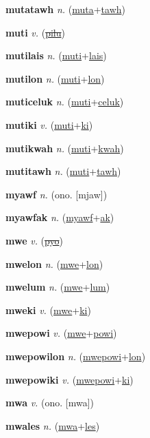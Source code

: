 \textbf{\hypertarget{mutatawh}{mutatawh}} \textit{n.} (\hyperlink{muta}{muta}+\allowbreak \hyperlink{tawh}{tawh})


\textbf{\hypertarget{muti}{muti}} \textit{v.} (\hyperlink{pilu}{\sout{pilu}})


\textbf{\hypertarget{mutilais}{mutilais}} \textit{n.} (\hyperlink{muti}{muti}+\allowbreak \hyperlink{lais}{lais})


\textbf{\hypertarget{mutilon}{mutilon}} \textit{n.} (\hyperlink{muti}{muti}+\allowbreak \hyperlink{lon}{lon})


\textbf{\hypertarget{muticeluk}{muticeluk}} \textit{n.} (\hyperlink{muti}{muti}+\allowbreak \hyperlink{celuk}{celuk})


\textbf{\hypertarget{mutiki}{mutiki}} \textit{v.} (\hyperlink{muti}{muti}+\allowbreak \hyperlink{ki}{ki})


\textbf{\hypertarget{mutikwah}{mutikwah}} \textit{n.} (\hyperlink{muti}{muti}+\allowbreak \hyperlink{kwah}{kwah})


\textbf{\hypertarget{mutitawh}{mutitawh}} \textit{n.} (\hyperlink{muti}{muti}+\allowbreak \hyperlink{tawh}{tawh})


\textbf{\hypertarget{myawf}{myawf}} \textit{n.} (ono. [mjaw])


\textbf{\hypertarget{myawfak}{myawfak}} \textit{n.} (\hyperlink{myawf}{myawf}+\allowbreak \hyperlink{ak}{ak})


\textbf{\hypertarget{mwe}{mwe}} \textit{v.} (\hyperlink{pyo}{\sout{pyo}})


\textbf{\hypertarget{mwelon}{mwelon}} \textit{n.} (\hyperlink{mwe}{mwe}+\allowbreak \hyperlink{lon}{lon})


\textbf{\hypertarget{mwelum}{mwelum}} \textit{n.} (\hyperlink{mwe}{mwe}+\allowbreak \hyperlink{lum}{lum})


\textbf{\hypertarget{mweki}{mweki}} \textit{v.} (\hyperlink{mwe}{mwe}+\allowbreak \hyperlink{ki}{ki})


\textbf{\hypertarget{mwepowi}{mwepowi}} \textit{v.} (\hyperlink{mwe}{mwe}+\allowbreak \hyperlink{powi}{powi})


\textbf{\hypertarget{mwepowilon}{mwepowilon}} \textit{n.} (\hyperlink{mwepowi}{mwepowi}+\allowbreak \hyperlink{lon}{lon})


\textbf{\hypertarget{mwepowiki}{mwepowiki}} \textit{v.} (\hyperlink{mwepowi}{mwepowi}+\allowbreak \hyperlink{ki}{ki})


\textbf{\hypertarget{mwa}{mwa}} \textit{v.} (ono. [mwa])


\textbf{\hypertarget{mwales}{mwales}} \textit{n.} (\hyperlink{mwa}{mwa}+\allowbreak \hyperlink{les}{les})


